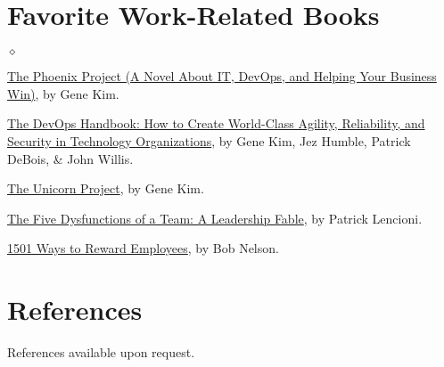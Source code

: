 \documentclass[margin,line,pifont,palatino,10pt]{res}
\begin{document}
\begin{resume}
\section{\sc Favorite Work-Related Books}
\begin{list}{$\diamond$}{\leftmargin=0.15in}
	\item \href{https://www.amazon.com/Phoenix-Project-DevOps-Helping-Business/dp/1942788290/ref=sr_1_2?dchild=1&keywords=gene+kim&qid=1616636863&sr=8-2}{The Phoenix Project (A Novel About IT, DevOps, and Helping Your Business Win)}, by Gene Kim.
	\item \href{https://www.amazon.com/DevOps-Handbook-World-Class-Reliability-Organizations/dp/1942788002/ref=sr_1_3?dchild=1&keywords=gene+kim&qid=1616636863&sr=8-3}{The DevOps Handbook:  How to Create World-Class Agility, Reliability, and Security in Technology Organizations}, by Gene Kim, Jez Humble, Patrick DeBois, \& John Willis.
	\item \href{https://www.amazon.com/Unicorn-Project-Developers-Disruption-Thriving/dp/1942788762/ref=sr_1_1?dchild=1&keywords=gene+kim&qid=1616636863&sr=8-1}{The Unicorn Project}, by Gene Kim.
	\item \href{https://www.amazon.com/Five-Dysfunctions-Team-Leadership-Fable/dp/0787960756/ref=sr_1_1?crid=3I8FG8CLI6P3R&dchild=1&keywords=five+dysfunctions+of+a+team&qid=1616637023&sprefix=five+dysf%2Caps%2C270&sr=8-1}{The Five Dysfunctions of a Team:  A Leadership Fable}, by Patrick Lencioni.
	\item \href{https://www.amazon.com/1501-Reward-Employees-Nelson-Ph-D/dp/0761168788/ref=sr_1_1?crid=2BGYF4F8U4317&dchild=1&keywords=1501+ways+to+reward+employees+by+bob+nelson&qid=1616637149&sprefix=1501+ways%2Caps%2C265&sr=8-1}{1501 Ways to Reward Employees}, by Bob Nelson.
\end{list}





\vspace{1.5mm}
\section{\sc References}
References available upon request.

\end{resume}
\end{document}
